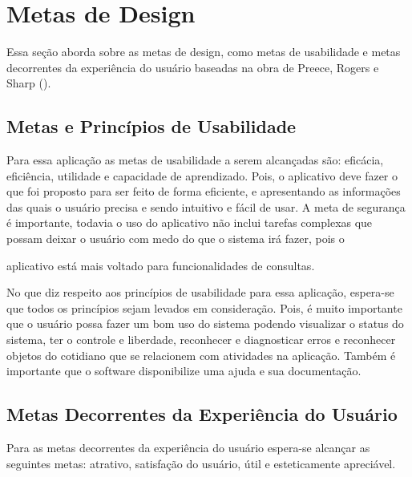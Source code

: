 \vfill
\chapter[Metas]{Metas de Design}
\label{metas}

Essa seção aborda sobre as metas de design, como metas de usabilidade e metas decorrentes da experiência do usuário 
baseadas na obra de Preece, Rogers e Sharp (\citeyear{preece}).
\section{Metas e Princípios de Usabilidade}

Para essa aplicação as metas de usabilidade a serem alcançadas são: eficácia, eficiência, utilidade e capacidade de 
aprendizado. Pois, o aplicativo deve fazer o que foi proposto para ser feito de forma eficiente, e apresentando as
informações das quais o usuário precisa e sendo intuitivo e fácil de usar. A meta de segurança é importante, todavia o uso 
do aplicativo não inclui tarefas complexas que possam deixar o usuário com medo do que o sistema irá fazer, pois o

aplicativo está mais voltado para funcionalidades de consultas.

No que diz respeito aos princípios de usabilidade para essa aplicação, espera-se que todos os princípios sejam levados em 
consideração. Pois, é muito importante que o usuário possa fazer um bom uso do sistema podendo visualizar o
status do sistema, ter o controle e liberdade, reconhecer e diagnosticar erros e reconhecer objetos do cotidiano que 
se relacionem com atividades na aplicação. Também é importante que o software disponibilize uma ajuda e sua documentação.
\section{Metas Decorrentes da Experiência do Usuário}

Para as metas decorrentes da experiência do usuário espera-se alcançar as seguintes metas: atrativo, satisfação do usuário,
útil e esteticamente apreciável.